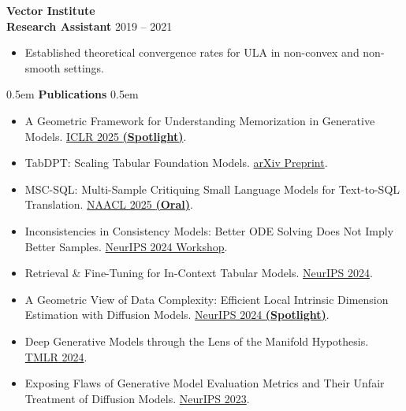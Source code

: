 \documentclass[11pt,a4paper]{article}
\newcommand{\cvsection}[1]{%
    \vspace{10pt}
    \noindent\hfill\kern0.5em
    {\Huge \textbf{\textcolor{maincolor}{#1}}}%
    \kern0.5em\hfill\vspace{8pt}
}
\begin{document}
{\Large \textbf{\textcolor{maincolor}{Vector Institute}}} \\
\textbf{Research Assistant} \hfill 2019 -- 2021
\begin{itemize}[noitemsep, topsep=4pt, leftmargin=1.5em, label=\textcolor{maincolorlight}{$\circ$}]
    \item Established theoretical convergence rates for ULA in non-convex and non-smooth settings.
\end{itemize}
\vspace{15pt}

\cvsection{Publications}
\begin{itemize}[noitemsep, topsep=4pt, leftmargin=0em, label=\textcolor{maincolorlight}{$\circ$}]
    \item A Geometric Framework for Understanding Memorization in Generative Models. {\textcolor{venuecolor}{\href{https://arxiv.org/abs/2411.00113}{ICLR 2025 \textbf{(Spotlight)}}}}.
    \item TabDPT: Scaling Tabular Foundation Models. {\textcolor{venuecolor}{\href{https://arxiv.org/abs/2410.18164}{arXiv Preprint}}}.
    \item MSC-SQL: Multi-Sample Critiquing Small Language Models for Text-to-SQL Translation. {\textcolor{venuecolor}{\href{https://aclanthology.org/2025.naacl-long.107/}{NAACL 2025  \textbf{(Oral)}}}}.
    \item Inconsistencies in Consistency Models: Better ODE Solving Does Not Imply Better Samples. {\textcolor{venuecolor}{\href{https://openreview.net/forum?id=2p4ES8QPUi}{NeurIPS 2024 Workshop}}}.
    \item Retrieval \& Fine-Tuning for In-Context Tabular Models. {\textcolor{venuecolor}{\href{https://proceedings.neurips.cc/paper_files/paper/2024/hash/c40daf14d7a6469e65116507c21faeb7-Abstract-Conference.html}{NeurIPS 2024}}}.
    \item A Geometric View of Data Complexity: Efficient Local Intrinsic Dimension Estimation with Diffusion Models. {\textcolor{venuecolor}{\href{https://proceedings.neurips.cc/paper_files/paper/2024/hash/43ab1646052dab79731f5d70bf40f6dc-Abstract-Conference.html}{NeurIPS 2024 \textbf{(Spotlight)}}}}.
    \item Deep Generative Models through the Lens of the Manifold Hypothesis. {\textcolor{venuecolor}{\href{https://openreview.net/forum?id=a90WpmSi0I}{TMLR 2024}}}.
    \item Exposing Flaws of Generative Model Evaluation Metrics and Their Unfair Treatment of Diffusion Models. {\textcolor{venuecolor}{\href{https://papers.nips.cc/paper_files/paper/2023/hash/0bc795afae289ed465a65a3b4b1f4eb7-Abstract-Conference.html}{NeurIPS 2023}}}.

\end{itemize}
\end{document}

